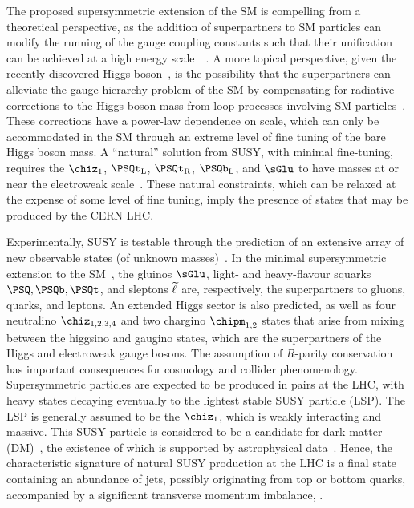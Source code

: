 The proposed supersymmetric extension of the SM is compelling from a
theoretical perspective, as the addition of superpartners to SM
particles can modify the running of the gauge coupling constants such
that their unification can be achieved at a high energy
scale~~\cite{Dimopoulos:1981yj, Ibanez:1981yh, Marciano:1981un}. A
more topical perspective, given the recently discovered Higgs
boson~\cite{ref:atlashiggsdiscovery, ref:cmshiggsdiscovery,
  ref:cmshiggsdiscoverylong}, is the possibility that the
superpartners can alleviate the gauge hierarchy problem of the SM by
compensating for radiative corrections to the Higgs boson mass from
loop processes involving SM particles~\cite{ref:hierarchy1,
  ref:hierarchy2}. These corrections have a power-law dependence on
scale, which can only be accommodated in the SM through an extreme
level of fine tuning of the bare Higgs boson mass. A ``natural''
solution from SUSY, with minimal fine-tuning, requires the $\chiz_1$,
$\PSQt_\text{L}$, $\PSQt_\text{R}$, $\PSQb_\text{L}$, and $\sGlu$ to
have masses at or near the electroweak
scale~\cite{ref:barbierinsusy}. These natural constraints, which can
be relaxed at the expense of some level of fine tuning, imply the
presence of states that may be produced by the CERN LHC.

Experimentally, SUSY is testable through the prediction of an
extensive array of new observable states (of unknown
masses)~\cite{ref:SUSY4, ref:SUSY2}. In the minimal supersymmetric
extension to the SM~\cite{ref:SUSY2}, the gluinos $\sGlu$, light- and
heavy-flavour squarks $\PSQ, \PSQb, \PSQt$, and sleptons $\widetilde{\ell}$ are,
respectively, the superpartners to gluons, quarks, and leptons. An
extended Higgs sector is also predicted, as well as four neutralino
$\chiz_{1,2,3,4}$ and two chargino $\chipm_{1,2}$ states that arise
from mixing between the higgsino and gaugino states, which are the
superpartners of the Higgs and electroweak gauge bosons.  The
assumption of $R$-parity conservation~\cite{Farrar:1978xj} has
important consequences for cosmology and collider
phenomenology. Supersymmetric particles are expected to be produced in
pairs at the LHC, with heavy states decaying eventually to the
lightest stable SUSY particle (LSP). The LSP is generally assumed to
be the $\chiz_1$, which is weakly interacting and massive. This SUSY
particle is considered to be a candidate for dark matter
(DM)~\cite{Jungman:1995df}, the existence of which is supported by
astrophysical data~\cite{1674-1137-38-9-090001}.  Hence, the
characteristic signature of natural SUSY production at the LHC is a
final state containing an abundance of jets, possibly originating from
top or bottom quarks, accompanied by a significant transverse momentum
imbalance, \ptvecmiss.

